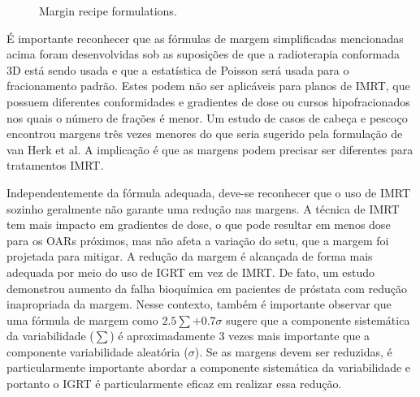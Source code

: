 \documentclass[11pt,a4paper]{article}
\begin{document}
	\begin{figure}[h]
		\centering
		\caption{Margin recipe formulations.}
		\label{fig:margensIcru83}
	\end{figure}
	

	É importante reconhecer que as fórmulas de margem simplificadas mencionadas acima foram desenvolvidas sob as suposições de que a radioterapia conformada 3D está sendo usada e que a estatística de Poisson será usada para o fracionamento padrão. Estes podem não ser aplicáveis para planos de IMRT, que possuem diferentes conformidades e gradientes de dose ou cursos hipofracionados nos quais o número de frações é menor. Um estudo de casos de cabeça e pescoço encontrou margens três vezes menores do que seria sugerido pela formulação de van Herk et al. A implicação é que as margens podem precisar ser diferentes para tratamentos IMRT.

	Independentemente da fórmula adequada, deve-se reconhecer que o uso de IMRT sozinho geralmente não garante uma redução nas margens. A técnica de IMRT tem mais impacto em gradientes de dose, o que pode resultar em menos dose para os OARs próximos, mas não afeta a variação do setu, que a margem foi projetada para mitigar. A redução da margem é alcançada de forma mais adequada por meio do uso de IGRT em vez de IMRT. De fato, um estudo demonstrou aumento da falha bioquímica em pacientes de próstata com redução inapropriada da margem. Nesse contexto, também é importante observar que uma fórmula de margem como $2.5\sum + 0.7\sigma$ sugere que a componente sistemática da variabilidade ($\sum$) é aproximadamente 3 vezes mais importante que a componente variabilidade aleatória ($\sigma$). Se as margens devem ser reduzidas, é particularmente importante abordar a componente sistemática da variabilidade e portanto o IGRT é particularmente eficaz em realizar essa redução.
\end{document}
